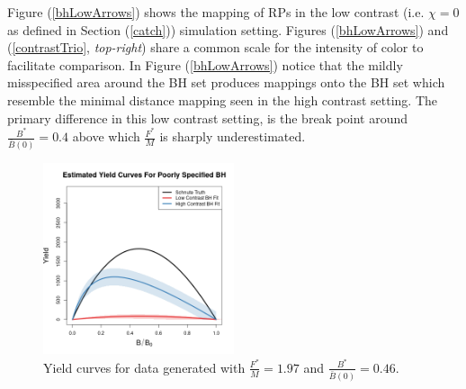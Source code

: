 %
Figure (\ref{bhLowArrows}) shows the mapping of RPs in the low contrast (i.e. $\chi=0$ as defined in Section (\ref{catch}))
simulation setting. Figures (\ref{bhLowArrows}) and (\ref{contrastTrio},
\emph{top-right}) share a common scale for the intensity of color to
facilitate comparison. In Figure (\ref{bhLowArrows}) notice that the mildly
misspecified area around the BH set produces mappings onto the BH set which
resemble the minimal distance mapping seen in the high contrast setting. %
The primary difference in this low contrast setting, is the break point
around $\frac{B^*}{\bar B(0)}=0.4$ above which $\frac{F^*}{M}$ is sharply
underestimated.

%
\begin{figure}
\includegraphics[width=0.5\textwidth]{../gpBias/yeildRelCurveCompareHHardFlatT30N150WWideN112PrettyX1.9707Z0.4633.png}
\vspace{-1cm}
\caption{
Yield curves for data generated with $\frac{F^*}{M}=1.97$ and $\frac{B^*}{\bar B(0)}=0.46$. %
}
\label{bhFmsy}
\end{figure}


